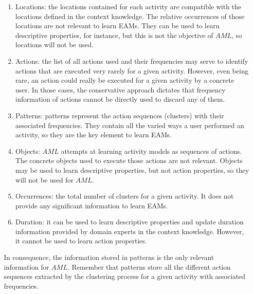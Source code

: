 \begin{enumerate}
 \item Locations: the locations contained for each activity are compatible with the locations defined in the context knowledge. The relative occurrences of those locations are not relevant to learn EAMs. They can be used to learn descriptive properties, for instance, but this is not the objective of $AML$, so locations will not be used.
 \item Actions: the list of all actions used and their frequencies may serve to identify actions that are executed very rarely for a given activity. However, even being rare, an action could really be executed for a given activity by a concrete user. In those cases, the conservative approach dictates that frequency information of actions cannot be directly used to discard any of them.
 \item Patterns: patterns represent the action sequences (clusters) with their associated frequencies. They contain all the varied ways a user performed an activity, so they are the key element to learn EAMs.
 \item Objects: $AML$ attempts at learning activity models as sequences of actions. The concrete objects used to execute those actions are not relevant. Objects may be used to learn descriptive properties, but not action properties, so they will not be used for $AML$.
 \item Occurrences: the total number of clusters for a given activity. It does not provide any significant information to learn EAMs.
 \item Duration: it can be used to learn descriptive properties and update duration information provided by domain experts in the context knowledge. However, it cannot be used to learn action properties.
\end{enumerate}

In consequence, the information stored in patterns is the only relevant information for $AML$. Remember that patterns store all the different action sequences extracted by the clustering process for a given activity with associated frequencies. 

